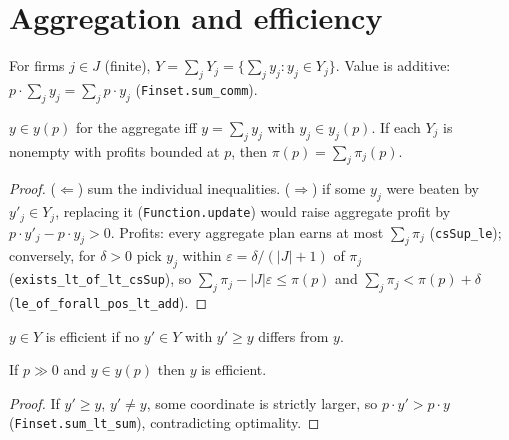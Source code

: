 \section{Aggregation and efficiency}
\label{sec:aggregation}

\begin{definition}
\label{def:aggregate}
\leanok
{}
For firms $j \in J$ (finite), $Y = \sum_j Y_j = \{\sum_j y_j : y_j \in Y_j\}$. Value is additive:
$p\cdot \sum_j y_j = \sum_j p\cdot y_j$ (\texttt{Finset.sum\_comm}).
\end{definition}

\begin{theorem}
\label{thm:aggregation}
\leanok
{}
$y \in y(p)$ for the aggregate iff $y = \sum_j y_j$ with $y_j \in y_j(p)$. If each $Y_j$ is nonempty
with profits bounded at $p$, then $\pi(p) = \sum_j \pi_j(p)$.
\end{theorem}
\begin{proof}
\leanok
($\Leftarrow$) sum the individual inequalities. ($\Rightarrow$) if some $y_j$ were beaten by
$y'_j \in Y_j$, replacing it (\texttt{Function.update}) would raise aggregate profit by
$p\cdot y'_j - p\cdot y_j > 0$. Profits: every aggregate plan earns at most $\sum_j \pi_j$
(\texttt{csSup\_le}); conversely, for $\delta > 0$ pick $y_j$ within $\varepsilon = \delta/(|J|+1)$ of
$\pi_j$ (\texttt{exists\_lt\_of\_lt\_csSup}), so $\sum_j \pi_j - |J|\varepsilon \le \pi(p)$ and
$\sum_j\pi_j < \pi(p) + \delta$ (\texttt{le\_of\_forall\_pos\_lt\_add}).
\end{proof}

\begin{definition}
\label{def:efficient}
\leanok
$y \in Y$ is efficient if no $y' \in Y$ with $y' \ge y$ differs from $y$.
\end{definition}

\begin{theorem}
\label{thm:efficient-of-supply}
\leanok
{}
If $p \gg 0$ and $y \in y(p)$ then $y$ is efficient.
\end{theorem}
\begin{proof}
\leanok
If $y' \ge y$, $y' \ne y$, some coordinate is strictly larger, so $p\cdot y' > p \cdot y$
(\texttt{Finset.sum\_lt\_sum}), contradicting optimality.
\end{proof}

